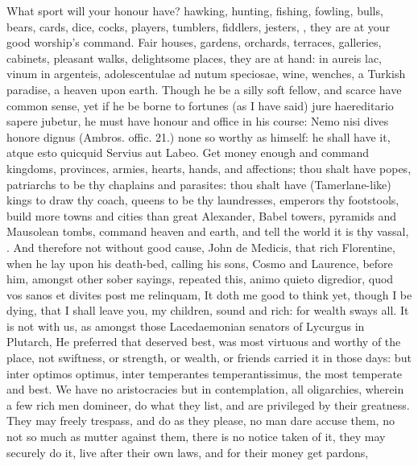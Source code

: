 {{What sport will your honour have? hawking, hunting, fishing, fowling,
bulls, bears, cards, dice, cocks, players, tumblers, fiddlers, jesters,
\etc{}, they are at your good worship's command. Fair houses, gardens,
orchards, terraces, galleries, cabinets, pleasant walks, delightsome
places, they are at hand: in aureis lac, vinum in argenteis,
adolescentulae ad nutum speciosae, wine, wenches, \etc{} a Turkish
paradise, a heaven upon earth. Though he be a silly soft fellow, and
scarce have common sense, yet if he be borne to fortunes (as I have
said) jure haereditario sapere jubetur, he must have honour and
office in his course: Nemo nisi dives honore dignus (Ambros.
offic. 21.) none so worthy as himself: he shall have it, atque esto
quicquid Servius aut Labeo. Get money enough and command
kingdoms, provinces, armies, hearts, hands, and affections; thou
shalt have popes, patriarchs to be thy chaplains and parasites: thou
shalt have (Tamerlane-like) kings to draw thy coach, queens to be thy
laundresses, emperors thy footstools, build more towns and cities than
great Alexander, Babel towers, pyramids and Mausolean tombs, \etc{}
command heaven and earth, and tell the world it is thy vassal, . And therefore not without good
cause, John de Medicis, that rich Florentine, when he lay upon his
death-bed, calling his sons, Cosmo and Laurence, before him, amongst
other sober sayings, repeated this, animo quieto digredior, quod vos
sanos et divites post me relinquam, It doth me good to think yet,
though I be dying, that I shall leave you, my children, sound and rich:
for wealth sways all. It is not with us, as amongst those Lacedaemonian
senators of Lycurgus in Plutarch, He preferred that deserved best, was
most virtuous and worthy of the place, not swiftness, or
strength, or wealth, or friends carried it in those days: but inter
optimos optimus, inter temperantes temperantissimus, the most temperate
and best. We have no aristocracies but in contemplation, all
oligarchies, wherein a few rich men domineer, do what they list, and
are privileged by their greatness. They may freely trespass, and
do as they please, no man dare accuse them, no not so much as mutter
against them, there is no notice taken of it, they may securely do it,
live after their own laws, and for their money get pardons,
}}
